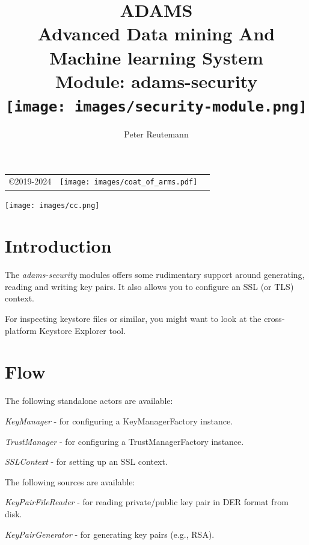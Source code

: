 \documentclass[a4paper]{book}
\title{
  \textbf{ADAMS} \\
  {\Large \textbf{A}dvanced \textbf{D}ata mining \textbf{A}nd \textbf{M}achine
  learning \textbf{S}ystem} \\
  {\Large Module: adams-security} \\
  \vspace{1cm}
  \texttt{[image: images/security-module.png]} \\
}
\author{
  Peter Reutemann
}
\begin{document}
\begin{titlepage}
\maketitle

\thispagestyle{empty}
\center
\begin{table}[b]
	\begin{tabular}{c l l}
		\parbox[c][2cm]{2cm}{\copyright 2019-2024} &
		\parbox[c][2cm]{5cm}{\texttt{[image: images/coat\_of\_arms.pdf]}} \\
	\end{tabular}
	\texttt{[image: images/cc.png]} \\
\end{table}

\end{titlepage}

\tableofcontents
\listoffigures

\chapter{Introduction}
The \textit{adams-security} modules offers some rudimentary support around
generating, reading and writing key pairs. It also allows you to configure
an SSL (or TLS) context.

For inspecting keystore files or similar, you might want to look at the
cross-platform Keystore Explorer\cite{kse} tool.

\chapter{Flow}
\noindent The following standalone actors are available:
\begin{tight_itemize}
  \item \textit{KeyManager} - for configuring a KeyManagerFactory instance.
  \item \textit{TrustManager} - for configuring a TrustManagerFactory instance.
  \item \textit{SSLContext} - for setting up an SSL context.
\end{tight_itemize}

\noindent The following sources are available:
\begin{tight_itemize}
  \item \textit{KeyPairFileReader} - for reading private/public key pair in
  DER format from disk.
  \item \textit{KeyPairGenerator} - for generating key pairs (e.g., RSA).
\end{tight_itemize}
\end{document}
